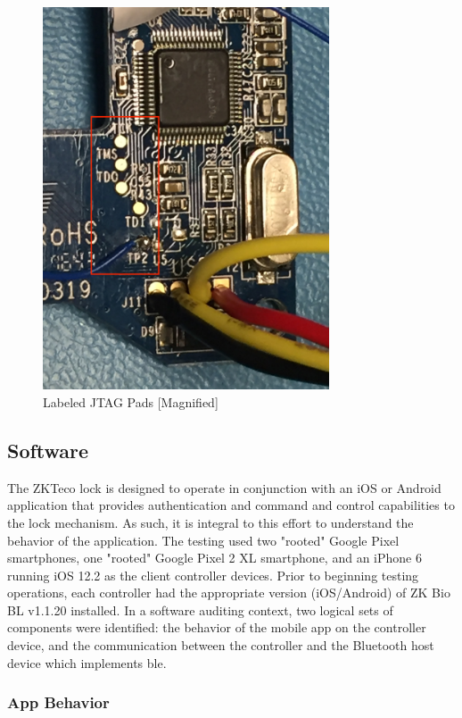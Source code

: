 \documentclass[conference]{IEEEtran}
\begin{document}
\begin{figure}[ht]
  \includegraphics[width=8.5cm]{images/JTAG2.jpg}
  \caption{Labeled JTAG Pads [Magnified]}
  \label{fig:jtag}
\end{figure}

\subsection{Software}

The ZKTeco lock is designed to operate in conjunction with an iOS or Android application that provides authentication and command and control capabilities to the lock mechanism.  As such, it is integral to this effort to understand the behavior of the application.  The testing used two "rooted" Google Pixel smartphones, one "rooted" Google Pixel 2 XL smartphone, and an iPhone 6 running iOS 12.2 as the client controller devices.  Prior to beginning testing operations, each controller had the appropriate version (iOS/Android) of ZK Bio BL v1.1.20 installed.  In a software auditing context, two logical sets of components were identified: the behavior of the mobile app on the controller device, and the communication between the controller and the Bluetooth host device which implements \gls{ble}.

\bigskip
\subsubsection{App Behavior}
\end{document}

